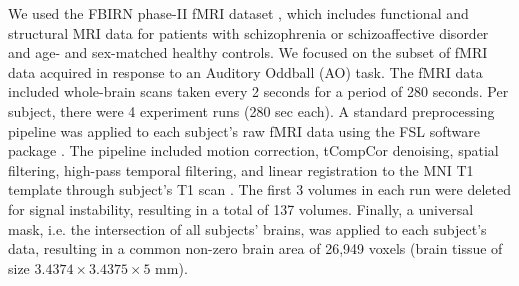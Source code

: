 \documentclass{article}
\begin{document}
We used the FBIRN phase-II fMRI dataset \citep{Keator2016}
, which includes functional and structural MRI data for patients with schizophrenia or schizoaffective disorder and age- and sex-matched healthy controls. We focused on the subset of fMRI data acquired in response to an Auditory Oddball (AO) task.
The fMRI data included whole-brain scans taken every 2 seconds for a period of 280 seconds. Per subject, there were 4 experiment runs (280 sec each).
A standard preprocessing pipeline was applied to each subject's raw fMRI data using the FSL software package \citep{Jenkinson2012}. The pipeline included motion correction, tCompCor denoising, spatial filtering, high-pass temporal filtering, and linear registration to the MNI T1 template through subject's T1 scan \citep[see][for a more detailed description of the preprocessing stages]{Gheiratmand2017}. The first 3 volumes in each run were deleted for signal instability, resulting in a total of 137 volumes. Finally, a universal mask, i.e. the intersection of all subjects' brains, was applied to each subject's data, resulting in a common non-zero brain area of 26,949 voxels (brain tissue of size $3.4374\times3.4375\times5$ mm).
\end{document}
